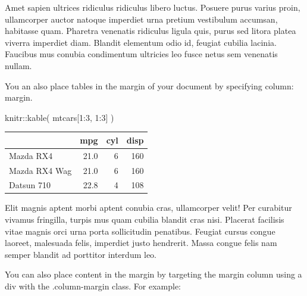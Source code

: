 \documentclass[
  brazilian,
  11pt,
  a4paper,
  open = right,
  twoside = true]{scrbook}
\newenvironment{Shaded}{\begin{snugshade}}{\end{snugshade}}
\newcommand{\DecValTok}[1]{\textcolor[rgb]{0.55,0.29,0.58}{#1}}
\newcommand{\FunctionTok}[1]{\textcolor[rgb]{1.00,0.23,0.00}{#1}}
\newcommand{\NormalTok}[1]{\textcolor[rgb]{0.10,0.10,0.10}{#1}}
\newcommand{\SpecialCharTok}[1]{\textcolor[rgb]{0.85,0.00,0.31}{#1}}
\newcounter{none} %
\begin{document}
Amet sapien ultrices ridiculus ridiculus libero luctus. Posuere purus
varius proin, ullamcorper auctor natoque imperdiet urna pretium
vestibulum accumsan, habitasse quam. Pharetra venenatis ridiculus ligula
quis, purus sed litora platea viverra imperdiet diam. Blandit elementum
odio id, feugiat cubilia lacinia. Faucibus mus conubia condimentum
ultricies leo fusce netus sem venenatis nullam.

You an also place tables in the margin of your document by specifying
column: margin.

\begin{Shaded}
\begin{Highlighting}[numbers=left,,]
\NormalTok{knitr}\SpecialCharTok{::}\FunctionTok{kable}\NormalTok{(}
\NormalTok{  mtcars[}\DecValTok{1}\SpecialCharTok{:}\DecValTok{3}\NormalTok{, }\DecValTok{1}\SpecialCharTok{:}\DecValTok{3}\NormalTok{]}
\NormalTok{)}
\end{Highlighting}
\end{Shaded}

{\def\LTcaptype{none} %
\begin{longtable}[]{@{}lrrr@{}}
\toprule\noalign{}
& mpg & cyl & disp \\
\midrule\noalign{}
\endhead
\bottomrule\noalign{}
\endlastfoot
Mazda RX4 & 21.0 & 6 & 160 \\
Mazda RX4 Wag & 21.0 & 6 & 160 \\
Datsun 710 & 22.8 & 4 & 108 \\
\end{longtable}
}

Elit magnis aptent morbi aptent conubia cras, ullamcorper velit! Per
curabitur vivamus fringilla, turpis mus quam cubilia blandit cras nisi.
Placerat facilisis vitae magnis orci urna porta sollicitudin penatibus.
Feugiat cursus congue laoreet, malesuada felis, imperdiet justo
hendrerit. Massa congue felis nam semper blandit ad porttitor interdum
leo.

You can also place content in the margin by targeting the margin column
using a div with the .column-margin class. For example:

\end{document}
